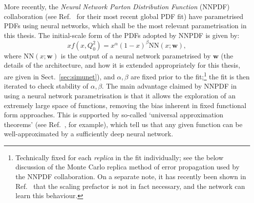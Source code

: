 \documentclass[withindex,glossary]{cam-thesis}
\renewcommand{\vec}[1]{\textbf{#1}} %
\begin{document}
More recently, the \textit{Neural Network Parton Distribution Function} (NNPDF) collaboration (see Ref.~\cite{NNPDF:2021njg} for their most recent global PDF fit) have parametrised PDFs using neural networks, which shall be the most relevant parametrisation in this thesis. The initial-scale form of the PDFs adopted by NNPDF is given by:
\begin{equation}
xf(x,Q_0^2) = x^{\alpha}(1-x)^{\beta} \text{NN}(x; \vec{w}),
\end{equation}
where $\text{NN}(x; \vec{w})$ is the output of a neural network parametrised by $\vec{w}$ (the details of the architecture, and how it is extended appropriately for this thesis, are given in Sect.~\ref{sec:simunet}), and $\alpha, \beta$ are fixed prior to the fit;\footnote{Technically fixed for each \textit{replica} in the fit individually; see the below discussion of the Monte Carlo replica method of error propagation used by the NNPDF collaboration. On a separate note, it has recently been shown in Ref.~\cite{Carrazza:2021yrg} that the scaling prefactor is not in fact necessary, and the network can learn this behaviour.} the fit is then iterated to check stability of $\alpha, \beta$. The main advantage claimed by NNPDF in using a neural network parametrisation is that it allows the exploration of an extremely large space of functions, removing the bias inherent in fixed functional form approaches. This is supported by so-called `universal approximation theorems' (see Ref.~\cite{HORNIK1989359}, for example), which tell us that any given function can be well-approximated by a sufficiently deep neural network.
\end{document}
